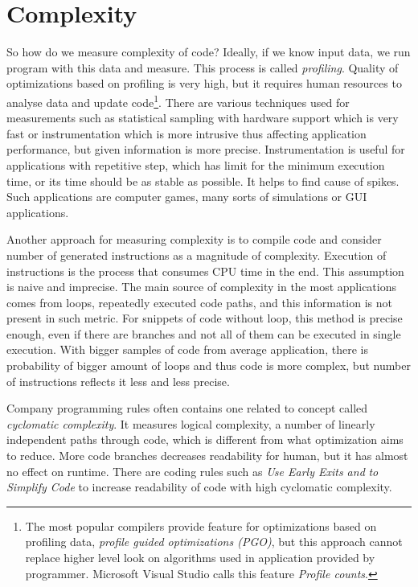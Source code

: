 \section{Complexity}
\label{yield-complexity}
So how do we measure complexity of code? Ideally, if we know input data, we run program with this data and measure. This process is called \emph{profiling}. Quality of optimizations based on profiling is very high, but it requires human resources to analyse data and update code\footnote{The most popular compilers provide feature for optimizations based on profiling data, \emph{profile guided optimizations (PGO)}, but this approach cannot replace higher level look on algorithms used in application provided by programmer. Microsoft Visual Studio calls this feature \emph{Profile counts}.}. There are various techniques used for measurements such as statistical sampling with hardware support which is very fast or instrumentation which is more intrusive thus affecting application performance, but given information is more precise. Instrumentation is useful for applications with repetitive step, which has limit for the minimum execution time, or its time should be as stable as possible. It helps to find cause of spikes. Such applications are computer games, many sorts of simulations or GUI applications.

Another approach for measuring complexity is to compile code and consider number of generated instructions as a magnitude of complexity. Execution of instructions is the process that consumes CPU time in the end. This assumption is naive and imprecise. The main source of complexity in the most applications comes from loops, repeatedly executed code paths, and this information is not present in such metric. For snippets of code without loop, this method is precise enough, even if there are branches and not all of them can be executed in single execution. With bigger samples of code from average application, there is probability of bigger amount of loops and thus code is more complex, but number of instructions reflects it less and less precise.

Company programming rules often contains one related to concept called \emph{cyclomatic complexity}. It measures logical complexity, a number of linearly independent paths through code, which is different from what optimization aims to reduce. More code branches decreases readability for human, but it has almost no effect on runtime. There are coding rules such as \emph{Use Early Exits and}  \emph{to Simplify Code} \cite{llvm-coding-standards} to increase readability of code with high cyclomatic complexity.

